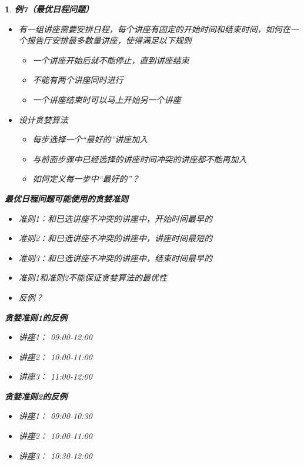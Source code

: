 \documentclass[UTF8]{report}
\theoremstyle{MyLineTheoremStyle} %
\theoremstyle{MyBlockTheoremStyle} %
\theoremstyle{MySubsubsectionStyle} %
\newtheorem{definition}{}
\begin{document}
\begin{definition}
    \textbf{例7（最优日程问题）}\par
    \begin{itemize}
        \item 有一组讲座需要安排日程，每个讲座有固定的开始时间和结束时间，如何在一个报告厅安排最多数量讲座，使得满足以下规则
        \begin{itemize}
            \item 一个讲座开始后就不能停止，直到讲座结束
            \item 不能有两个讲座同时进行
            \item 一个讲座结束时可以马上开始另一个讲座
        \end{itemize}
        \item 设计贪婪算法
        \begin{itemize}
            \item 每步选择一个“最好的”讲座加入
            \item 与前面步骤中已经选择的讲座时间冲突的讲座都不能再加入
            \item 如何定义每一步中“最好的”？
        \end{itemize}
    \end{itemize}

    \textbf{最优日程问题可能使用的贪婪准则}\par
    \begin{itemize}
        \item 准则1：和已选讲座不冲突的讲座中，开始时间最早的
        \item 准则2：和已选讲座不冲突的讲座中，讲座时间最短的
        \item 准则3：和已选讲座不冲突的讲座中，结束时间最早的
        \item 准则1和准则2不能保证贪婪算法的最优性
        \item 反例？
    \end{itemize}

    \textbf{贪婪准则1的反例}\par
    \begin{itemize}
        \item 讲座1： 09:00-12:00
        \item 讲座2： 10:00-11:00
        \item 讲座3： 11:00-12:00
    \end{itemize}

    \textbf{贪婪准则2的反例}\par
    \begin{itemize}
        \item 讲座1： 09:00-10:30
        \item 讲座2： 10:00-11:00
        \item 讲座3： 10:30-12:00
    \end{itemize}


\end{definition}
\end{document}
